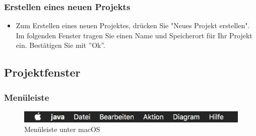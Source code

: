 \subsubsection{Erstellen eines neuen Projekts}
\begin{itemize}
\item Zum Erstellen eines neuen Projektes, drücken Sie "Neues Projekt erstellen". Im folgenden Fenster tragen Sie einen Name und Speicherort für Ihr Projekt ein. Bestätigen Sie mit ''Ok''.  
\end{itemize}

\subsection{Projektfenster}
\subsubsection{Menüleiste}
\begin{figure}[h!]
	\centering
	\includegraphics[width=1.0\textwidth]{Leiste.png}
	\caption{Menüleiste unter macOS}
\end{figure}
